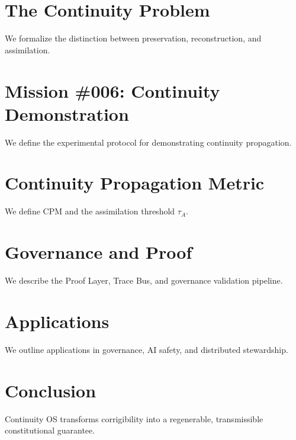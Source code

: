 \documentclass[11pt]{article}
\begin{document}
\section{The Continuity Problem}
We formalize the distinction between preservation, reconstruction, and assimilation.

\section{Mission \#006: Continuity Demonstration}
We define the experimental protocol for demonstrating continuity propagation.

\section{Continuity Propagation Metric}
We define CPM and the assimilation threshold $\tau_A$.

\section{Governance and Proof}
We describe the Proof Layer, Trace Bus, and governance validation pipeline.

\section{Applications}
We outline applications in governance, AI safety, and distributed stewardship.

\section{Conclusion}
Continuity OS transforms corrigibility into a regenerable, transmissible constitutional guarantee.
\end{document}
